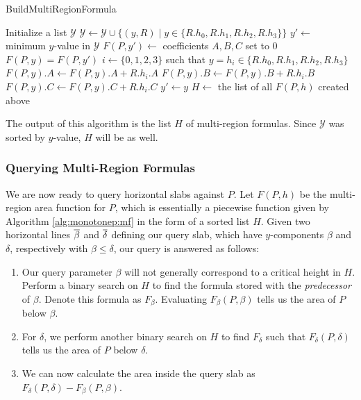 \begin{algorithm}[h]
\LinesNumbered
\DontPrintSemicolon
\caption{BuildMultiRegionFormula}
\label{alg:monotonep:mf}
\BlankLine
Initialize a list $\mathcal{Y}$\;
{
$\mathcal{Y} \gets \mathcal{Y} \cup \{ (y,R) \;|\; y \in \{R.h_0, R.h_1, R.h_2, 
R.h_3\}\}$\;
}
\;
\BlankLine
$y' \gets $ minimum $y$-value in $\mathcal{Y}$\;
$F(P, y') \gets $ coefficients $A,B,C$ set to 0\;
\BlankLine
{}
{
$F(P, y) = F(P, y')$\;
$i \gets \{0,1,2,3\}$ such that $y = h_i \in \{R.h_0, R.h_1, R.h_2, R.h_3\}$\;
$F(P,y).A \gets F(P,y).A + R.h_i.A$\;
$F(P,y).B \gets F(P,y).B + R.h_i.B$\;
$F(P,y).C \gets F(P,y).C + R.h_i.C$\;
\BlankLine
$y' \gets y$\;
}
\BlankLine
$H \gets $ the list of all $F(P, h)$ created above\;
\end{algorithm}

The output of this algorithm is the list $H$ of multi-region formulas. Since 
$\mathcal{Y}$ was sorted by $y$-value, $H$ will be as well.


\subsubsection{Querying Multi-Region Formulas}
\label{:monotonep:query-mf}

We are now ready to query horizontal slabs against $P$. 
Let $F(P,h)$ be the multi-region area function for $P$, which is essentially a 
piecewise function given by Algorithm \ref{alg:monotonep:mf} in the form of 
a sorted list $H$.
Given two horizontal lines $\overline{\beta}$ and $\overline{\delta}$ defining our 
query slab, which have $y$-components $\beta$ and $\delta$, respectively with 
$\beta \leq \delta$, our query is answered as follows:

\begin{enumerate}
\item Our query parameter $\beta$ will not generally correspond to a critical 
height in $H$.
Perform a binary search on $H$ to find the formula stored with the 
\emph{predecessor} of $\beta$.
Denote this formula as $F_\beta$.
Evaluating $F_\beta(P, \beta)$ tells us the area of $P$ below $\beta$.

\item For $\delta$, we perform another binary search on $H$ to find $F_\delta$ 
such that $F_\delta(P, \delta)$ tells us the area of $P$ below $\delta$.

\item We can now calculate the area inside the query slab as
$F_\delta(P, \delta) - F_\beta(P, \beta)$.

\end{enumerate}

